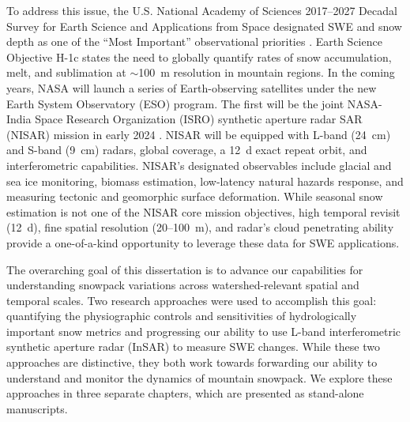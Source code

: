 To address this issue, the U.S. National Academy of Sciences 2017--2027 Decadal Survey for Earth Science and Applications from Space designated SWE and snow depth as one of the ``Most Important” observational priorities \citep{nationalacademiesofsciencesengineeringandmedicineThrivingOurChanging2019}. Earth Science Objective H-1c states the need to globally quantify rates of snow accumulation, melt, and sublimation at $\sim$100~m resolution in mountain regions. In the coming years, NASA will launch a series of Earth-observing satellites under the new Earth System Observatory (ESO) program. The first will be the joint NASA-India Space Research Organization (ISRO) synthetic aperture radar SAR (NISAR) mission in early 2024 \citep{rosenNASAISROSARNISAR2017, kelloggNASAISROSyntheticAperture2020}. NISAR will be equipped with L-band (24~cm) and S-band (9~cm) radars, global coverage, a 12~d exact repeat orbit, and interferometric capabilities. NISAR’s designated observables include glacial and sea ice monitoring, biomass estimation, low-latency natural hazards response, and measuring tectonic and geomorphic surface deformation. While seasonal snow estimation is not one of the NISAR core mission objectives, high temporal revisit (12~d), fine spatial resolution (20--100~m), and radar’s cloud penetrating ability provide a one-of-a-kind opportunity to leverage these data for SWE applications.

The overarching goal of this dissertation is to advance our capabilities for understanding snowpack variations across watershed-relevant spatial and temporal scales. Two research approaches were used to accomplish this goal: quantifying the physiographic controls and sensitivities of hydrologically important snow metrics and progressing our ability to use L-band interferometric synthetic aperture radar (InSAR) to measure SWE changes. While these two approaches are distinctive, they both work towards forwarding our ability to understand and monitor the dynamics of mountain snowpack. We explore these approaches in three separate chapters, which are presented as stand-alone manuscripts. 


